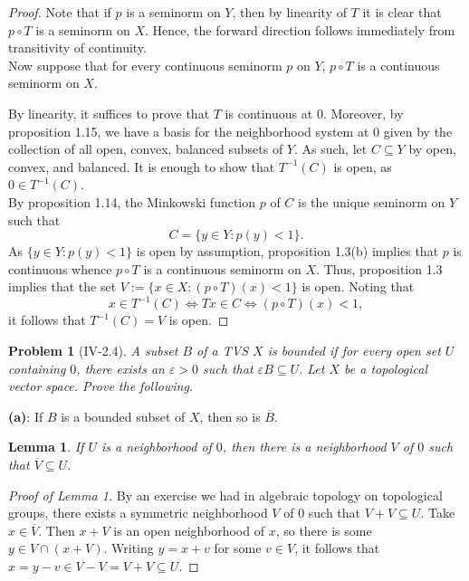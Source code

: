 \documentclass[12pt,letterpaper]{scrartcl}
\newcommand{\sub}{\subseteq}
\newcommand{\eps}{\varepsilon}
\newcommand*\cls[1]{\overline{#1}}
\theoremstyle{mystyle}
\newtheorem*{problem}{Problem}
\theoremstyle{plain}
\newtheorem{lemma}{Lemma}[]
\theoremstyle{remark}
\begin{document}
\begin{proof}
  Note that if $p$ is a seminorm on $Y$, then by linearity of $T$ it is clear that $p\circ T$ is a seminorm on $X$. Hence, the forward direction follows immediately from transitivity of continuity. \\

  Now suppose that for every continuous seminorm $p$ on $Y$, $p\circ T$ is a continuous seminorm on $X$.

  By linearity, it suffices to prove that $T$ is continuous at $0$. Moreover, by proposition 1.15, we have a basis for the neighborhood system at $0$ given by the collection of all open, convex, balanced subsets of $Y$. As such, let $C\sub Y$ by open, convex, and balanced. It is enough to show that $T^{-1}(C)$ is open, as $0\in T^{-1}(C)$.\\

  By proposition 1.14, the Minkowski function $p$ of $C$ is the unique seminorm on $Y$ such that
  \[
    C = \{y\in Y : p(y) < 1\}.
  \]
  As $\{y\in Y : p(y)<1\}$ is open by assumption, proposition 1.3(b) implies that $p$ is continuous whence $p\circ T$ is a continuous seminorm on $X$. Thus, proposition 1.3 implies that the set $V:=\{x\in X: (p\circ T)(x) < 1\}$ is open. Noting that
  \[
    x\in T^{-1}(C) \iff Tx \in C \iff (p\circ T)(x)<1,
  \]
  it follows that $T^{-1}(C)= V$ is open.
\end{proof}

\vspace{3pt}
\begin{problem}[IV-2.4]
  A subset $B$ of a TVS $X$ is \emph{bounded} if for every open set $U$ containing $0$, there exists an $\eps>0$ such that $\eps B\sub U$.
  Let $X$ be a topological vector space. Prove the following.
\end{problem}

  \textbf{(a)}: If $B$ is a bounded subset of $X$, then so is $\cls{B}$.

  \begin{lemma}
    If $U$ is a neighborhood of $0$, then there is a neighborhood $V$ of $0$ such that $\cls{V}\sub U$.
  \end{lemma}

  \begin{proof}[Proof of Lemma 1]
    By an exercise we had in algebraic topology on topological groups, there exists a symmetric neighborhood $V$ of $0$ such that $V+V\sub U$. Take $x\in \cls{V}$. Then $x + V$ is an open neighborhood of $x$, so there is some $y\in V\cap (x + V)$. Writing $y = x+v$ for some $v\in V$, it follows that $x = y-v\in V-V = V+V\sub U$.
  \end{proof}
\end{document}
